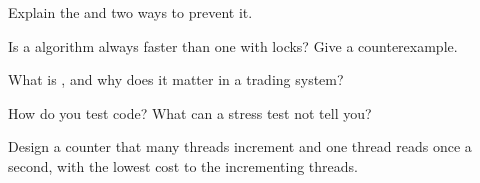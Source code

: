 \begin{interviewq}\label{iq:ll:lock-free-programming:2}
Explain the  and two ways to prevent it.
\end{interviewq}

\begin{interviewq}\label{iq:ll:lock-free-programming:3}
Is a  algorithm always faster than one with locks? Give a counterexample.
\end{interviewq}

\begin{interviewq}\label{iq:ll:lock-free-programming:4}
What is , and why does it matter in a trading system?
\end{interviewq}

\begin{interviewq}\label{iq:ll:lock-free-programming:5}
How do you test  code? What can a stress test not tell you?
\end{interviewq}

\begin{interviewq}\label{iq:ll:lock-free-programming:6}
Design a counter that many threads increment and one thread reads once a second, with the lowest cost to the incrementing
threads.
\end{interviewq}
